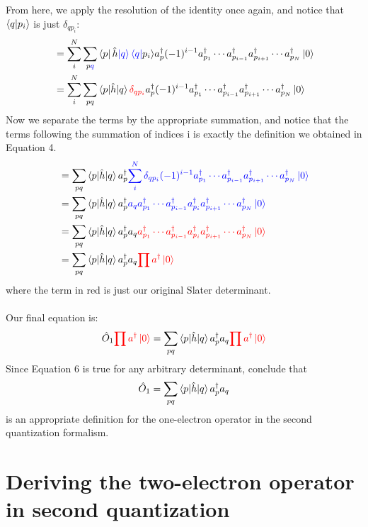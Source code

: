 \documentclass{article}
\newcommand{\dg}{\ensuremath{^\dagger} }
\newcommand{\cd}{\ensuremath{\cdots} }
\begin{document}
From here, we apply the resolution of the identity once again, and notice that $\braket{q | p_i }$ is just $\delta_{q p_i}$: 
\begin{align*}
&= \sum_i^N  \sum_{p{\color{blue}q}} \bra{p}\hat{h}{\color{blue} \ket{ q} \bra{q }}p_i \rangle a_p^\dagger (-1)^{i-1} a_{p_1}^\dagger \cdots a_{p_{i-1}}^\dagger a_{p_{i+1}}^\dagger \cdots a_{p_N}^\dagger \ket{0}\\
&= \sum_i^N  \sum_{pq} \braket{p | \hat{h} | q} {\color{red}\delta_{q p_i}} a_p^\dagger (-1)^{i-1} a_{p_1}^\dagger \cdots a_{p_{i-1}}^\dagger a_{p_{i+1}}^\dagger \cdots a_{p_N}^\dagger \ket{0}\\
\end{align*}
Now we separate the terms by the appropriate summation, and notice that the terms following the summation of indices i is exactly the definition we obtained in Equation 4. 
\begin{align*}
&=  \sum_{pq} \braket{p | \hat{h} | q}  a_p^\dagger {\color{blue} \sum_i^N \delta_{q p_i} (-1)^{i-1} a_{p_1}^\dagger \cdots a_{p_{i-1}}^\dagger a_{p_{i+1}}^\dagger \cdots a_{p_N}^\dagger \ket{0}}\\
&=  \sum_{pq} \braket{p | \hat{h} | q}  a_p^\dagger {\color{blue} a_q a_{p_1}\dg \cd a_{p_{i -1}}\dg a_{p_i}\dg a_{p_{i +1}}\dg \cd a_{p_N}\dg \ket{0}}\\
&=  \sum_{pq} \braket{p | \hat{h} | q}  a_p^\dagger a_q  {\color{red} a_{p_1}\dg \cd a_{p_{i -1}}\dg a_{p_i}\dg a_{p_{i +1}}\dg \cd a_{p_N}\dg \ket{0}}\\
&=  \sum_{pq} \braket{p | \hat{h} | q}  a_p^\dagger a_q  {\color{red} \prod a\dg \ket{0}}\\
\end{align*}
where the term in {\color{red} red} is just our original Slater determinant.  \\ \\
Our final equation is: 
\begin{equation}
\hat{O}_1 {\color{red} \prod a\dg \ket{0}}  = \sum_{pq} \braket{p | \hat{h} | q}  a_p^\dagger a_q  {\color{red} \prod a\dg \ket{0}} 
\end{equation}
Since Equation 6 is true for any arbitrary determinant, conclude that 
\begin{equation}
\hat{O}_1 = \sum_{pq} \braket{p | \hat{h} | q}  a_p^\dagger a_q 
\end{equation}
is an appropriate definition for the one-electron operator in the second quantization formalism.

\section{Deriving the two-electron operator in second quantization}
\end{document}

